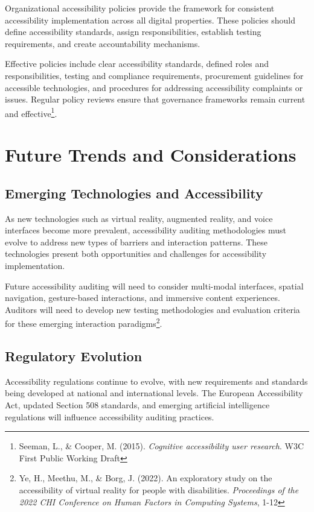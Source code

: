 Organizational accessibility policies provide the framework for consistent accessibility implementation across all digital properties. These policies should define accessibility standards, assign responsibilities, establish testing requirements, and create accountability mechanisms.

Effective policies include clear accessibility standards, defined roles and responsibilities, testing and compliance requirements, procurement guidelines for accessible technologies, and procedures for addressing accessibility complaints or issues. Regular policy reviews ensure that governance frameworks remain current and effective\footnote{Seeman, L., \& Cooper, M. (2015). \textit{Cognitive accessibility user research}. W3C First Public Working Draft}.

\section{Future Trends and Considerations}\label{sec:future-trends}

\subsection{Emerging Technologies and Accessibility}

As new technologies such as virtual reality, augmented reality, and voice interfaces become more prevalent, accessibility auditing methodologies must evolve to address new types of barriers and interaction patterns. These technologies present both opportunities and challenges for accessibility implementation.

Future accessibility auditing will need to consider multi-modal interfaces, spatial navigation, gesture-based interactions, and immersive content experiences. Auditors will need to develop new testing methodologies and evaluation criteria for these emerging interaction paradigms\footnote{Ye, H., Meethu, M., \& Borg, J. (2022). An exploratory study on the accessibility of virtual reality for people with disabilities. \textit{Proceedings of the 2022 CHI Conference on Human Factors in Computing Systems}, 1-12}.

\subsection{Regulatory Evolution}

Accessibility regulations continue to evolve, with new requirements and standards being developed at national and international levels. The European Accessibility Act, updated Section 508 standards, and emerging artificial intelligence regulations will influence accessibility auditing practices.

